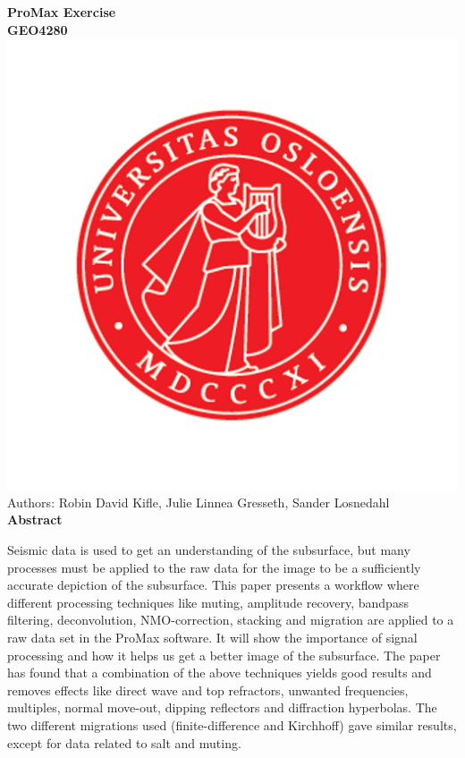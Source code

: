 \documentclass[10pt,a4paper]{article}
\begin{document}
\begin{center}
{\LARGE\bf ProMax Exercise\\GEO4280}
\\

\includegraphics[scale=0.1]{UiO.jpg}\\


Authors: Robin David Kifle, Julie Linnea Gresseth, Sander Losnedahl
\\
{\large\bf Abstract}
\end{center}

\noindent Seismic data is used to get an understanding of the subsurface, but many processes must be applied to the raw data for the image to be a sufficiently accurate depiction of the subsurface. This paper presents a workflow where different processing techniques like muting, amplitude recovery, bandpass filtering, deconvolution, NMO-correction, stacking and migration are applied to a raw data set in the ProMax software. It will show the importance of signal processing and how it helps us get a better image of the subsurface. The paper has found that a combination of the above techniques yields good results and removes effects like direct wave and top refractors, unwanted frequencies, multiples, normal move-out, dipping reflectors and diffraction hyperbolas. The two different migrations used (finite-difference and Kirchhoff) gave similar results, except for data related to salt and muting.
\end{document}
